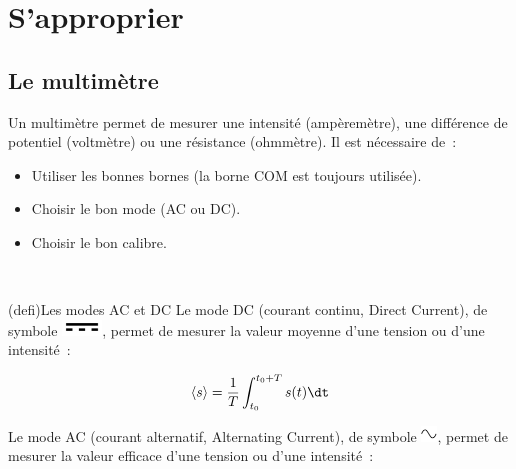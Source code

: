 \documentclass[../main/main.tex]{subfiles}
\begin{document}
{	\vspace{-30pt}
	\section{S'approprier}
	\subsection{Le multimètre}

	Un multimètre permet de mesurer une intensité (ampèremètre), une différence de
	potentiel (voltmètre) ou une résistance (ohmmètre). Il est nécessaire de~:
	\begin{itemize}
		\item Utiliser les bonnes bornes (la borne COM est
		      toujours utilisée).
		\item Choisir le bon mode (AC ou DC).
		\item Choisir le bon calibre.
	\end{itemize}

	\noindent
	\begin{minipage}[t]{.75\linewidth}
		~
		\begin{tcb}(defi){Les modes AC et DC}
			Le mode DC (courant continu, Direct Current), de symbole
			\includegraphics[height=12pt]{dc}, permet de mesurer la valeur moyenne d'une
			tension ou d'une intensité~:

			\begin{equation*}
				\left\langle s \right\rangle = \frac{1}{T} \int_{t_0}^{t_0+T} s(t) \dt
			\end{equation*}

			Le mode AC (courant alternatif, Alternating Current), de symbole
			\includegraphics[height=12pt]{ac}, permet de mesurer la valeur efficace
			d'une tension ou d'une intensité~:


\end{tcb}
\end{minipage}}
\end{document}
